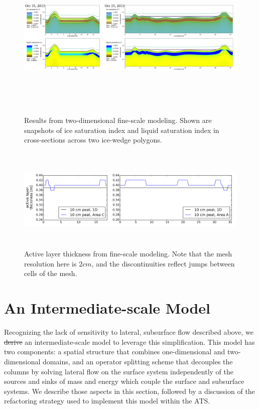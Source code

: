 \documentclass[review,11pt]{elsarticle}
\providecommand{\DIFadd}[1]{{\protect\color{blue}\uwave{#1}}} %
\providecommand{\DIFdel}[1]{{\protect\color{red}\sout{#1}}}                      %
\providecommand{\DIFaddbegin}{} %
\providecommand{\DIFaddend}{} %
\providecommand{\DIFdelbegin}{} %
\providecommand{\DIFdelend}{} %
\begin{document}
\begin{figure}
\centering
\includegraphics[height=8cm,width=17cm]{figures/FineScaleOct15.png}
\caption{Results from two-dimensional fine-scale modeling. Shown are snapshots of ice saturation index and liquid saturation index in cross-sections across two ice-wedge polygons.}
\label{oct15}
\end{figure}

\begin{figure}[!htpb]
\centering
\includegraphics[height=5cm, width=12cm]{figures/ALT-finescale.png}
\caption{Active layer thickness from fine-scale modeling.  Note that the mesh resolution here is $2 cm$, and the discontinuities reflect jumps between cells of the mesh.}
\label{alt}
\end{figure}


\section{An Intermediate-scale Model}\label{mixed-dim-model}
Recognizing the lack of sensitivity to lateral, subsurface flow described above, we \DIFdelbegin \DIFdel{derive }\DIFdelend \DIFaddbegin \DIFadd{propose }\DIFaddend an intermediate-scale model to leverage this simplification.
This model has two components: a spatial structure that combines one-dimensional and two-dimensional domains, and an operator splitting scheme that decouples the columns by solving lateral flow on the surface system independently of the sources and sinks of mass and energy which couple the surface and subsurface systems.
We describe those aspects in this section, followed by a discussion of the refactoring strategy used to implement this model within the ATS.
\end{document}
